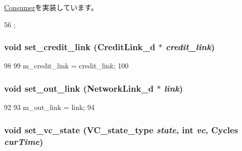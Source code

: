 \hyperlink{classConsumer_a3ea5f7af5db62cc24f4e40df9ea5c971}{Consumer}を実装しています。


\begin{DoxyCode}
56 {};
\end{DoxyCode}
\hypertarget{classOutputUnit__d_aa66db9bde5f92aad3f5bbc61cc861d2a}{
\subsubsection[{set\_\-credit\_\-link}]{\setlength{\rightskip}{0pt plus 5cm}void set\_\-credit\_\-link ({\bf CreditLink\_\-d} $\ast$ {\em credit\_\-link})}}
\label{classOutputUnit__d_aa66db9bde5f92aad3f5bbc61cc861d2a}



\begin{DoxyCode}
98 {
99     m_credit_link = credit_link;
100 }
\end{DoxyCode}
\hypertarget{classOutputUnit__d_a72a73c127bb17f1f7c2c010b3856c56c}{
\subsubsection[{set\_\-out\_\-link}]{\setlength{\rightskip}{0pt plus 5cm}void set\_\-out\_\-link ({\bf NetworkLink\_\-d} $\ast$ {\em link})}}
\label{classOutputUnit__d_a72a73c127bb17f1f7c2c010b3856c56c}



\begin{DoxyCode}
92 {
93     m_out_link = link;
94 }
\end{DoxyCode}
\hypertarget{classOutputUnit__d_a67dafbe49b665179990b2bdadfc133c9}{
\subsubsection[{set\_\-vc\_\-state}]{\setlength{\rightskip}{0pt plus 5cm}void set\_\-vc\_\-state ({\bf VC\_\-state\_\-type} {\em state}, \/  int {\em vc}, \/  {\bf Cycles} {\em curTime})}}
\label{classOutputUnit__d_a67dafbe49b665179990b2bdadfc133c9}



